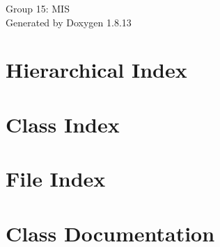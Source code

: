 \documentclass[twoside]{book}
\newcommand{\+}{\discretionary{\mbox{\scriptsize$\hookleftarrow$}}{}{}}
\newcommand{\clearemptydoublepage}{%
  \newpage{\pagestyle{empty}\cleardoublepage}%
}
\begin{document}
\hypersetup{pageanchor=false,
             bookmarksnumbered=true,
             pdfencoding=unicode
            }
\begin{titlepage}
\vspace*{7cm}
\begin{center}%
{\Large Group 15\+: M\+IS }\\
\vspace*{1cm}
{\large Generated by Doxygen 1.8.13}\\
\end{center}
\end{titlepage}
\clearemptydoublepage
{}
\tableofcontents
\clearemptydoublepage
{}
\hypersetup{pageanchor=true}

\chapter{Hierarchical Index}

\chapter{Class Index}

\chapter{File Index}

\chapter{Class Documentation}






















\end{document}
